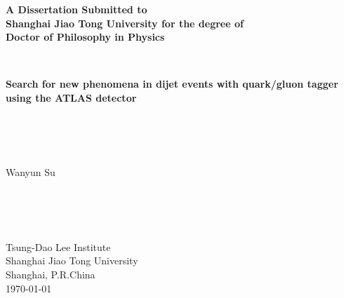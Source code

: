 \documentclass[UTF8,12pt]{ctexart}
\numberwithin{equation}{section}
\newcommand{\red}{\color{red}}
\begin{document}
	\thispagestyle{empty}
	
	\renewcommand{\headrulewidth}{0pt}
	\begin{figure}[htb] 
	\end{figure}
	
	
	
	\begin{center}
		\textbf{
			A Dissertation Submitted to \\
			Shanghai Jiao Tong University for the degree of \\
			Doctor of Philosophy in Physics}
	\end{center}
	~\\
	\begin{center}
		\textbf{
			Search for new phenomena in dijet events with quark/gluon tagger using the ATLAS detector}
	\end{center}
	~\\
	~\\
	~\\
	\begin{center}
		Wanyun Su\\
	\end{center}
	~\\
	~\\
	~\\
	\begin{center}
		Tsung-Dao Lee Institute\\ %
		Shanghai Jiao Tong University \\
		Shanghai, P.R.China \\
		\today
	\end{center}
	
	
	\newpage
	\thispagestyle{empty}
	~\\
	
\end{document}
